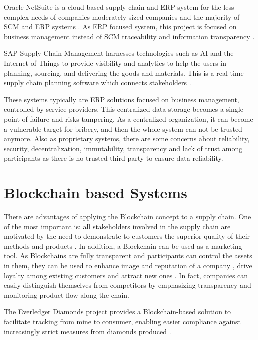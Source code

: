 Oracle NetSuite is a cloud based supply chain and ERP system for the less complex needs of companies moderately sized companies and the majority of SCM and ERP systems \cite{rolling2016using}. As ERP focused system, this project is focused on business management instead of SCM traceability and information transparency \cite{rolling2016using}.

SAP Supply Chain Management harnesses technologies such as AI and the Internet of Things to provide visibility and  analytics to help the users in planning, sourcing, and delivering the goods and materials.  This is a real-time supply chain planning software which connects stakeholders \cite{snapp2010discover}.

These systems typically are ERP solutions focused on business management, controlled by service providers.  This centralized data  storage becomes a single point of failure and risks tampering. As a centralized organization, it can become a vulnerable target for  bribery, and then the whole system can not be trusted anymore. Also as proprietary systems, there are some concerns about reliability, security, decentralization, immutability, transparency and lack of trust among participants as there is no trusted third party to ensure data reliability. 

\section{Blockchain based Systems} \label{sec:BlockchainBasedSystems}

There are advantages of applying the Blockchain concept to a supply chain. One of the most important is: all stakeholders involved in the supply chain are motivated by the need to demonstrate to customers the superior quality of their methods and products \cite{lu2017adaptable}. In addition, a Blockchain can be used as a marketing tool. As Blockchains are fully transparent and participants can control the assets in them, they can be used to enhance image and reputation of a company \cite{van2007essentials}, drive loyalty among existing customers \cite{pizzuti2015global} and attract new ones \cite{svensson2009transparency}. In fact, companies can easily distinguish themselves from competitors by emphasizing transparency and monitoring product flow along the chain. 

The Everledger Diamonds project provides a Blockchain-based solution to facilitate tracking from mine to consumer, enabling easier compliance against increasingly strict measures from diamonds produced \cite{crosby2016blockchain}.

